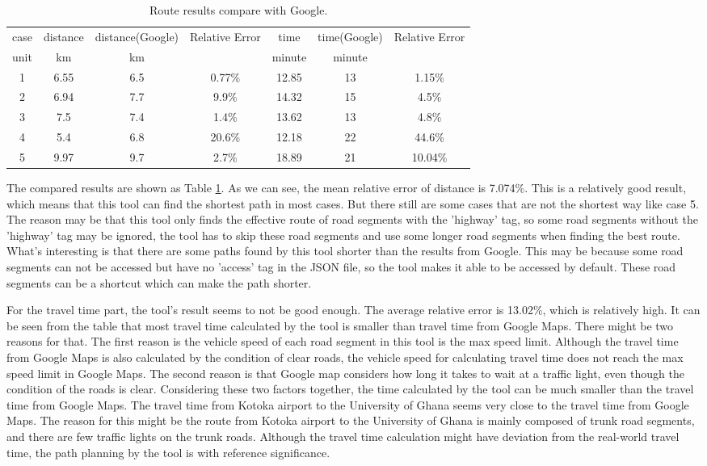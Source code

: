 \documentclass[final-report]{report-template}
\begin{document}
\begin{table}[H]
    \centering
    \begin{tabular}{|c|c|c|c|c|c|c|}
    \hline
   case & distance & distance(Google) & Relative Error & time & time(Google) & Relative Error\\
   unit & km & km &  & minute & minute &   \\
    \hline
    1 & 6.55 & 6.5 & 0.77\% & 12.85 & 13 & 1.15\% \\
    2 & 6.94 & 7.7 & 9.9\% & 14.32 & 15 & 4.5\% \\
    3 & 7.5 & 7.4 & 1.4\% & 13.62 & 13 & 4.8\% \\
    4 & 5.4 & 6.8 & 20.6\% & 12.18 & 22 & 44.6\% \\
    5 & 9.97 & 9.7 & 2.7\% & 18.89 & 21 & 10.04\% \\
    \hline
    \end{tabular}
    \caption{\label{tab:route_results}Route results compare with Google.}
\end{table}
The compared results are shown as Table \ref{tab:route_results}. 
As we can see, the mean relative error of distance is 7.074\%. 
This is a relatively good result, which means that this tool can find the shortest path in most cases.
But there still are some cases that are not the shortest way like case 5.
The reason may be that this tool only finds the effective route of road segments with the 'highway' tag,
so some road segments without the 'highway' tag may be ignored,
the tool has to skip these road segments and use some longer road segments when finding the best route.
What's interesting is that there are some paths found by this tool shorter than the results from Google.
This may be because some road segments can not be accessed but have no 'access' tag in the JSON file, 
so the tool makes it able to be accessed by default. These road segments can be a shortcut which can make the path shorter.

For the travel time part, the tool's result seems to not be good enough.
The average relative error is 13.02\%, which is relatively high. 
It can be seen from the table that most travel time calculated by the tool is smaller than travel time from Google Maps.
There might be two reasons for that. 
The first reason is the vehicle speed of each road segment in this tool is the max speed limit. 
Although the travel time from Google Maps is also calculated by the condition of clear roads, 
the vehicle speed for calculating travel time does not reach the max speed limit in Google Maps.
The second reason is that Google map considers how long it takes to wait at a traffic light, 
even though the condition of the roads is clear.
Considering these two factors together, the time calculated by the tool can be much smaller than the travel time from Google Maps.
The travel time from Kotoka airport to the University of Ghana seems very close to the travel time from Google Maps. 
The reason for this might be the route from Kotoka airport to the University of Ghana is mainly composed of trunk road segments,
and there are few traffic lights on the trunk roads.
Although the travel time calculation might have deviation from the real-world travel time, 
the path planning by the tool is with reference significance.
\end{document}
